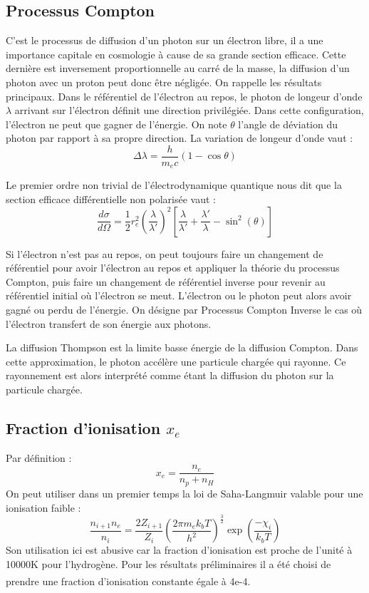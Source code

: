 \documentclass[10pt, a4paper]{report}
\numberwithin{equation}{subsection}
\begin{document}
\subsection{Processus Compton}
C'est le processus de diffusion d'un photon sur un électron libre, il a une importance capitale en cosmologie à cause de sa grande section efficace. Cette dernière est inversement proportionnelle au carré de la masse, la diffusion d'un photon avec un proton peut donc être négligée. On rappelle les résultats principaux. Dans le référentiel de l'électron au repos, le photon de longeur d'onde $\lambda$ arrivant sur l'électron définit une direction privilégiée. Dans cette configuration, l'électron ne peut que gagner de l'énergie. On note $\theta$ l'angle de déviation du photon par rapport à sa propre direction.
La variation de longeur d'onde vaut :
\begin{equation} \label{eq:VLO}
\boxed{\Delta\lambda=\frac{h}{m_e c}(1 - \cos \theta)}
\end{equation}

 Le premier ordre non trivial de l'électrodynamique quantique nous dit que la section efficace différentielle non polarisée vaut :
\begin{equation} \label{eq:QED}
\boxed{\frac{d\sigma}{d\Omega} = \frac{1}{2} r_e^2 \left(\frac{\lambda}{\lambda'}\right)^{2} \left[\frac{\lambda}{\lambda'} + \frac{\lambda'}{\lambda} - \sin^2(\theta)\right]}
\end{equation}


Si l'électron n'est pas au repos, on peut toujours faire un changement de référentiel pour avoir l'électron au repos et appliquer la théorie du processus Compton, puis faire un changement de référentiel inverse pour revenir au référentiel initial où l'électron se meut. L'électron ou le photon peut alors avoir gagné ou perdu de l'énergie. On désigne par Processus Compton Inverse le cas où l'électron transfert de son énergie aux photons.

La diffusion Thompson est la limite basse énergie de la diffusion Compton. Dans cette approximation, le photon accélère une particule chargée qui rayonne. Ce rayonnement est alors interprété comme étant la diffusion du photon sur la particule chargée. 
 
\subsection{Fraction d'ionisation $x_e$}
Par définition :
\begin{equation} \label{eq:XE}
\boxed{x_e= \frac{n_e}{n_p+n_H}}
\end{equation}
On peut utiliser dans un premier temps la loi de Saha-Langmuir valable pour une ionisation faible :
\begin{equation} \label{eq:XESL}
\boxed{\frac{n_{i+1} n_e }{n_i} = \frac{2 Z_{i+1}}{Z_i} \left( \frac{2\pi m_ek_bT}{h^2}\right)^{\frac{3}{2}} \exp(\frac{-\chi_i}{k_bT})}
\end{equation}
Son utilisation ici est abusive car la fraction d'ionisation est proche de l'unité à 10000K pour l'hydrogène. Pour les résultats préliminaires il a été choisi de prendre une fraction d'ionisation constante égale à 4e-4\textsuperscript{\cite{Flower}}.
\end{document}
